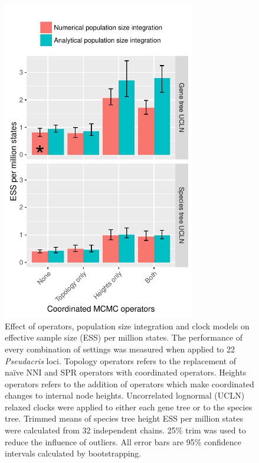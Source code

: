 \documentclass[12pt]{article}
\begin{document}
\begin{figure}[htb!]
\centering
\includegraphics[height=14cm]{speciesTreeHeight_ess_per_mstates.pdf}
\caption
{Effect of operators, population size integration and clock models on effective
sample size (ESS) per million states. The performance of every combination of
settings was measured when applied to 22 \textit{Pseudacris} loci. Topology operators refers to the
replacement of na\"ive NNI and SPR operators with coordinated operators. Heights
operators refers to the addition of operators which make coordinated changes to
internal node heights. Uncorrelated lognormal (UCLN) relaxed clocks were applied
to either each gene tree or to the species tree. Trimmed means
of species tree height ESS per million states were calculated from 32
independent chains. 25\% trim was used to reduce the influence
of outliers. All error bars are 95\% confidence intervals calculated by
bootstrapping.}
\label{fig:realEssPerMstates}
\end{figure}

\clearpage
\end{document}
